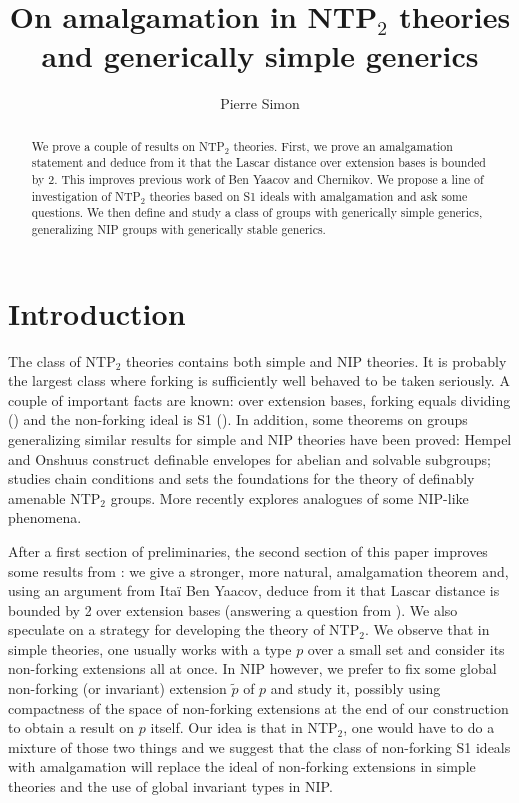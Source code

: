 \documentclass{amsart}
\author{Pierre Simon}
\title{On amalgamation in NTP$_2$ theories and generically simple generics}
\numberwithin{equation}{section}
\theoremstyle{definition}
\theoremstyle{mystyle}
\theoremstyle{remark}
\begin{document}
\begin{abstract}
We prove a couple of results on NTP$_2$ theories. First, we prove an amalgamation statement and deduce from it that the Lascar distance over extension bases is bounded by 2. This improves previous work of Ben Yaacov and Chernikov. We propose a line of investigation of NTP$_2$ theories based on S1 ideals with amalgamation and ask some questions. We then define and study a class of groups with generically simple generics, generalizing NIP groups with generically stable generics.
\end{abstract}
\maketitle
\section*{Introduction}

The class of NTP$_2$ theories contains both simple and NIP theories. It is probably the largest class where forking is sufficiently well behaved to be taken seriously. A couple of important facts are known: over extension bases, forking equals dividing (\cite{CherKapl}) and the non-forking ideal is S1 (\cite{CherBY}). In addition, some theorems on groups generalizing similar results for simple and NIP theories have been proved: Hempel and Onshuus \cite{HempOn} construct definable envelopes for abelian and solvable subgroups; \cite{groups_ntp} studies chain conditions and \cite{PRC} sets the foundations for the theory of definably amenable NTP$_2$ groups. More recently \cite{nipinntp} explores analogues of some NIP-like phenomena.

After a first section of preliminaries, the second section of this paper improves some results from \cite{CherBY}: we give a stronger, more natural, amalgamation theorem and, using an argument from Ita\" i Ben Yaacov, deduce from it that Lascar distance is bounded by 2 over extension bases (answering a question from \cite{CherBY}). We also speculate on a strategy for developing the theory of NTP$_2$. We observe that in simple theories, one usually works with a type $p$ over a small set and consider its non-forking extensions all at once. In NIP however, we prefer to fix some global non-forking (or invariant) extension $\tilde p$ of $p$ and study it, possibly using compactness of the space of non-forking extensions at the end of our construction to obtain a result on $p$ itself. Our idea is that in NTP$_2$, one would have to do a mixture of those two things and we suggest that the class of non-forking S1 ideals with amalgamation will replace the ideal of non-forking extensions in simple theories and the use of global invariant types in NIP.
\end{document}
